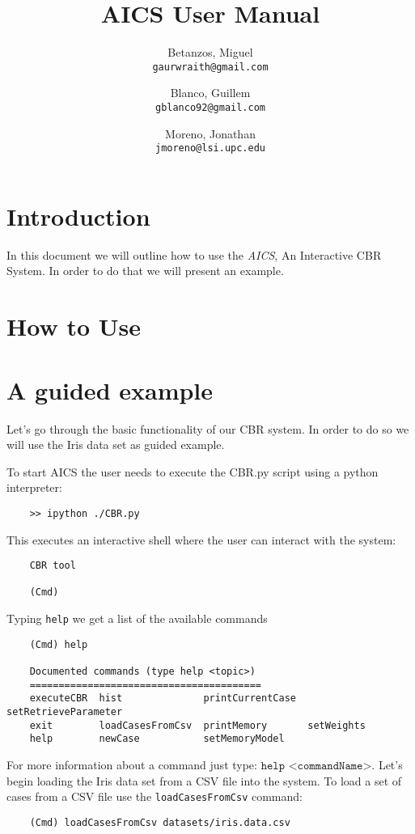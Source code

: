 \documentclass[11pt]{article}
\title{AICS User Manual}
\author{
  Betanzos, Miguel\\
  \texttt{gaurwraith@gmail.com}
  \and
  Blanco, Guillem\\
  \texttt{gblanco92@gmail.com}
  \and
  Moreno, Jonathan\\
  \texttt{jmoreno@lsi.upc.edu}
}
\date{}
\begin{document}
\maketitle


\section{Introduction}

In this document we will outline how to use the \emph{AICS}, An Interactive CBR System. In order to do that we will present an example.

\section{How to Use}

\section{A guided example}


Let's go through the basic functionality of our CBR system. In order to do so we will use the Iris data set as guided example.

To start AICS the user needs to execute the CBR.py script using a python interpreter:
\begin{verbatim}
    >> ipython ./CBR.py
\end{verbatim}
This executes an interactive shell where the user can interact with the system:
\begin{verbatim}
    CBR tool

    (Cmd)
\end{verbatim}
Typing \texttt{help} we get a list of the available commands
\begin{verbatim}
    (Cmd) help
    
    Documented commands (type help <topic>)
    ========================================
    executeCBR  hist              printCurrentCase  setRetrieveParameter
    exit        loadCasesFromCsv  printMemory       setWeights
    help        newCase           setMemoryModel

\end{verbatim}

For more information about a command just type: $\texttt{help <commandName>}$. Let's begin loading the Iris data set from a CSV file into the system. To load a set of cases from a CSV file use the \texttt{loadCasesFromCsv} command:
\begin{verbatim}
    (Cmd) loadCasesFromCsv datasets/iris.data.csv
\end{verbatim}
\end{document}
